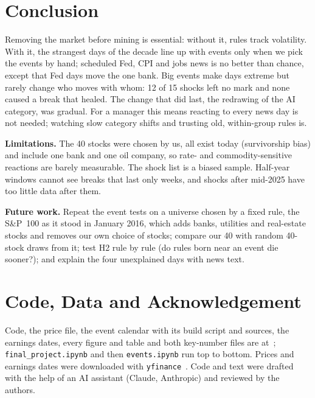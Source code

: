 \documentclass[conference]{IEEEtran}
\begin{document}
\section{Conclusion}
Removing the market before mining is essential: without it, rules track volatility. With it, the strangest days of the decade line up with events only when we pick the events by hand; scheduled Fed, CPI and jobs news is no better than chance, except that Fed days move the one bank. Big events make days extreme but rarely change who moves with whom: 12 of 15 shocks left no mark and none caused a break that healed. The change that did last, the redrawing of the AI category, was gradual. For a manager this means reacting to every news day is not needed; watching slow category shifts and trusting old, within-group rules is.

\textbf{Limitations.} The 40 stocks were chosen by us, all exist today (survivorship bias) and include one bank and one oil company, so rate- and commodity-sensitive reactions are barely measurable. The shock list is a biased sample. Half-year windows cannot see breaks that last only weeks, and shocks after mid-2025 have too little data after them.

\textbf{Future work.} Repeat the event tests on a universe chosen by a fixed rule, the S\&P~100 as it stood in January 2016, which adds banks, utilities and real-estate stocks and removes our own choice of stocks; compare our 40 with random 40-stock draws from it; test H2 rule by rule (do rules born near an event die sooner?); and explain the four unexplained days with news text.

\section*{Code, Data and Acknowledgement}
Code, the price file, the event calendar with its build script and sources, the earnings dates, every figure and table and both key-number files are at~\cite{repo}; \texttt{final\_project.ipynb} and then \texttt{events.ipynb} run top to bottom. Prices and earnings dates were downloaded with \texttt{yfinance}~\cite{yfinance}. Code and text were drafted with the help of an AI assistant (Claude, Anthropic) and reviewed by the authors.



\end{document}
